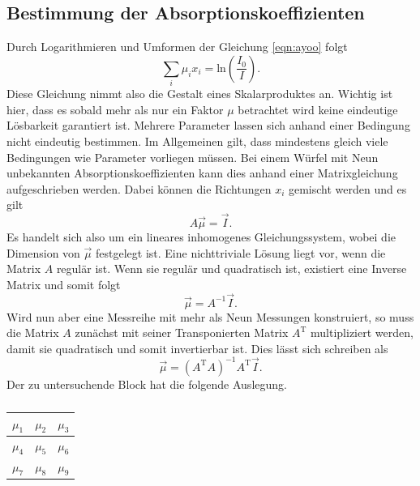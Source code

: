 \subsection{Bestimmung der Absorptionskoeffizienten}
Durch Logarithmieren und Umformen der Gleichung \eqref{eqn:ayoo} folgt
\begin{equation}
    \label{eqn:hierlol}
\sum_{i}^{} \mu_i x_i = \text{ln}\left(\frac{I_0}{I}\right).
\end{equation}
Diese Gleichung nimmt also die Gestalt eines Skalarproduktes an. Wichtig ist hier, dass es sobald mehr als nur ein Faktor $\mu$ betrachtet wird keine eindeutige Lösbarkeit garantiert ist. Mehrere Parameter lassen sich anhand einer Bedingung
nicht eindeutig bestimmen. Im Allgemeinen gilt, dass mindestens gleich viele Bedingungen wie Parameter vorliegen müssen. Bei einem Würfel mit Neun unbekannten Absorptionskoeffizienten kann dies anhand einer Matrixgleichung aufgeschrieben werden.
Dabei können die Richtungen $x_i$ gemischt werden und es gilt
\begin{equation*}
A \vec{\mu} = \vec{I}.
\end{equation*}
Es handelt sich also um ein lineares inhomogenes Gleichungssystem, wobei die Dimension von $\vec{\mu}$ festgelegt ist. Eine nichttriviale Lösung liegt vor, wenn die Matrix $A$ regulär ist. Wenn sie regulär und quadratisch ist, existiert
eine Inverse Matrix und somit folgt
\begin{equation*}
\vec{\mu} = A^{-1}\vec{I}.
\end{equation*}
Wird nun aber eine Messreihe mit mehr als Neun Messungen konstruiert, so muss die Matrix $A$ zunächst mit seiner Transponierten Matrix $A^{\text{T}}$ multipliziert werden, damit sie quadratisch und somit invertierbar ist. 
Dies lässt sich schreiben als 
\begin{equation*}
\vec{\mu} = (A^{\text{T}}A)^{-1} A^{\text{T}} \vec{I}.
\end{equation*}
Der zu untersuchende Block hat die folgende Auslegung.
\begin{table}
    \centering
    \caption*{} 
    \label{tab:3}
    \begin{tabular}{c | c | c}
        $\mu_1$ & $\mu_2$ & $\mu_3$ \\
        \midrule
        $\mu_4$ & $\mu_5$ & $\mu_6$  \\
        \midrule
        $\mu_7$ & $\mu_8$ & $\mu_9$  \\
    \end{tabular}
\end{table}
